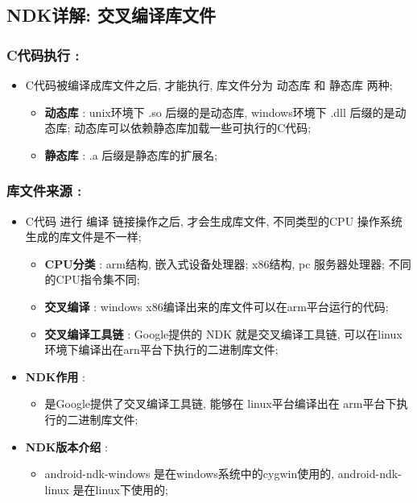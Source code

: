 \documentclass[9pt, b5paper]{article}
\begin{document}
\subsection{NDK详解: 交叉编译库文件}
\label{sec-1-4}
\subsubsection{C代码执行 :}
\label{sec-1-4-1}
\begin{itemize}
\item C代码被编译成库文件之后, 才能执行, 库文件分为 动态库 和 静态库 两种;
\begin{itemize}
\item \textbf{动态库} : unix环境下 .so 后缀的是动态库, windows环境下 .dll 后缀的是动态库; 动态库可以依赖静态库加载一些可执行的C代码;
\item \textbf{静态库} : .a 后缀是静态库的扩展名;
\end{itemize}
\end{itemize}
\subsubsection{库文件来源 :}
\label{sec-1-4-2}
\begin{itemize}
\item C代码 进行 编译 链接操作之后, 才会生成库文件, 不同类型的CPU 操作系统 生成的库文件是不一样;
\begin{itemize}
\item \textbf{CPU分类} : arm结构, 嵌入式设备处理器; x86结构, pc 服务器处理器; 不同的CPU指令集不同;
\item \textbf{交叉编译} : windows x86编译出来的库文件可以在arm平台运行的代码;
\item \textbf{交叉编译工具链} : Google提供的 NDK 就是交叉编译工具链, 可以在linux环境下编译出在arn平台下执行的二进制库文件;
\end{itemize}
\item \textbf{NDK作用} : 
\begin{itemize}
\item 是Google提供了交叉编译工具链, 能够在 linux平台编译出在 arm平台下执行的二进制库文件;
\end{itemize}
\item \textbf{NDK版本介绍} : 
\begin{itemize}
\item android-ndk-windows 是在windows系统中的cygwin使用的, android-ndk-linux 是在linux下使用的;
\end{itemize}
\end{itemize}
\end{document}
